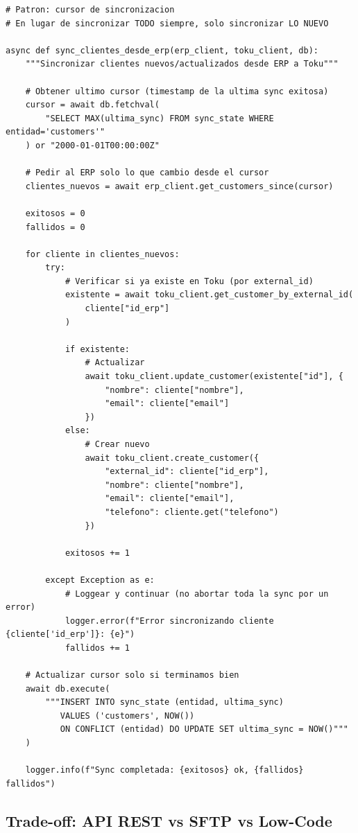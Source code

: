 \documentclass[11pt,a4paper]{article}
\begin{document}
\begin{lstlisting}[style=python]
# Patron: cursor de sincronizacion
# En lugar de sincronizar TODO siempre, solo sincronizar LO NUEVO

async def sync_clientes_desde_erp(erp_client, toku_client, db):
    """Sincronizar clientes nuevos/actualizados desde ERP a Toku"""

    # Obtener ultimo cursor (timestamp de la ultima sync exitosa)
    cursor = await db.fetchval(
        "SELECT MAX(ultima_sync) FROM sync_state WHERE entidad='customers'"
    ) or "2000-01-01T00:00:00Z"

    # Pedir al ERP solo lo que cambio desde el cursor
    clientes_nuevos = await erp_client.get_customers_since(cursor)

    exitosos = 0
    fallidos = 0

    for cliente in clientes_nuevos:
        try:
            # Verificar si ya existe en Toku (por external_id)
            existente = await toku_client.get_customer_by_external_id(
                cliente["id_erp"]
            )

            if existente:
                # Actualizar
                await toku_client.update_customer(existente["id"], {
                    "nombre": cliente["nombre"],
                    "email": cliente["email"]
                })
            else:
                # Crear nuevo
                await toku_client.create_customer({
                    "external_id": cliente["id_erp"],
                    "nombre": cliente["nombre"],
                    "email": cliente["email"],
                    "telefono": cliente.get("telefono")
                })

            exitosos += 1

        except Exception as e:
            # Loggear y continuar (no abortar toda la sync por un error)
            logger.error(f"Error sincronizando cliente {cliente['id_erp']}: {e}")
            fallidos += 1

    # Actualizar cursor solo si terminamos bien
    await db.execute(
        """INSERT INTO sync_state (entidad, ultima_sync)
           VALUES ('customers', NOW())
           ON CONFLICT (entidad) DO UPDATE SET ultima_sync = NOW()"""
    )

    logger.info(f"Sync completada: {exitosos} ok, {fallidos} fallidos")
\end{lstlisting}

\subsection{Trade-off: API REST vs SFTP vs Low-Code}
\end{document}
